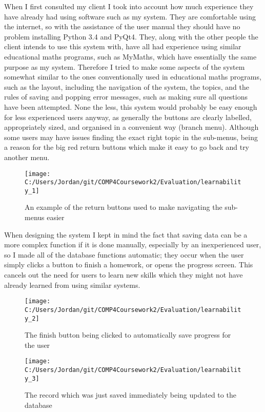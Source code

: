 When I first consulted my client I took into account how much experience they have already had using software such as my system. They are comfortable using the internet, so with the assistance of the user manual they should have no problem installing Python 3.4 and PyQt4. They, along with the other people the client intends to use this system with, have all had experience using similar educational maths programs, such as MyMaths, which have essentially the same purpose as my system. Therefore I tried to make some aspects of the system somewhat similar to the ones conventionally used in educational maths programs, such as the layout, including the navigation of the system, the topics, and the rules of saving and popping error messages, such as making sure all questions have been attempted. None the less, this system would probably be easy enough for less experienced users anyway, as generally the buttons are clearly labelled, appropriately sized, and organised in a convenient way (branch menu). Although some users may have issues finding the exact right topic in the sub-menus, being a reason for the big red return buttons which make it easy to go back and try another menu.

\begin{figure}[H]
	\texttt{[image: C:/Users/Jordan/git/COMP4Coursework2/Evaluation/learnability\_1]}
	\caption{An example of the return buttons used to make navigating the sub-menus easier}
\end{figure}

When designing the system I kept in mind the fact that saving data can be a more complex function if it is done manually, especially by an inexperienced user, so I made all of the database functions automatic; they occur when the user simply clicks a button to finish a homework, or opens the progress screen. This cancels out the need for users to learn new skills which they might not have already learned from using similar systems.

\begin{figure}[H]
	\texttt{[image: C:/Users/Jordan/git/COMP4Coursework2/Evaluation/learnability\_2]}
	\caption{The finish button being clicked to automatically save progress for the user}
\end{figure}

\begin{figure}[H]
	\texttt{[image: C:/Users/Jordan/git/COMP4Coursework2/Evaluation/learnability\_3]}
	\caption{The record which was just saved immediately being updated to the database}
\end{figure}

